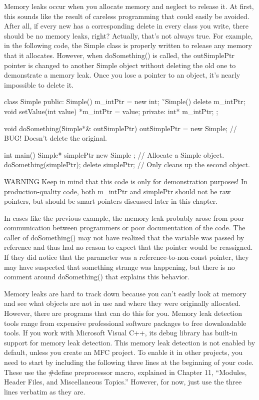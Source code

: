 Memory leaks occur when you allocate memory and neglect to release it. At first, this sounds like the result of careless programming that could easily be avoided. After all, if every new has a corresponding delete in every class you write, there should be no memory leaks, right? Actually, that’s not always true. For example, in the following code, the Simple class is properly written to release any memory that it allocates. However, when doSomething() is called, the outSimplePtr pointer is changed to another Simple object without deleting the old one to demonstrate a memory leak. Once you lose a pointer to an object, it’s nearly impossible to delete it.

\begin{cpp}
class Simple
{
    public:
    Simple() { m_intPtr = new int{}; }
    ˜Simple() { delete m_intPtr; }
    void setValue(int value) { *m_intPtr = value; }
    private:
    int* m_intPtr;
};

void doSomething(Simple*& outSimplePtr)
{
    outSimplePtr = new Simple{}; // BUG! Doesn't delete the original.
}

int main()
{
    Simple* simplePtr { new Simple{} }; // Allocate a Simple object.
    doSomething(simplePtr);
    delete simplePtr; // Only cleans up the second object.
}
\end{cpp}

\begin{myWarning}{WARNING}
Keep in mind that this code is only for demonstration purposes! In production-quality code, both m\_intPtr and simplePtr should not be raw pointers, but should be smart pointers discussed later in this chapter.
\end{myWarning}

In cases like the previous example, the memory leak probably arose from poor communication between programmers or poor documentation of the code. The caller of doSomething() may not have realized that the variable was passed by reference and thus had no reason to expect that the pointer would be reassigned. If they did notice that the parameter was a reference-to-non-const pointer, they may have suspected that something strange was happening, but there is no comment around doSomething() that explains this behavior.


Memory leaks are hard to track down because you can’t easily look at memory and see what objects are not in use and where they were originally allocated. However, there are programs that can do this for you. Memory leak detection tools range from expensive professional software packages to free downloadable tools. If you work with Microsoft Visual C++, its debug library has built-in support for memory leak detection. This memory leak detection is not enabled by default, unless you create an MFC project. To enable it in other projects, you need to start by including the following three lines at the beginning of your code. These use the \#define preprocessor macro, explained in Chapter 11, “Modules, Header Files, and Miscellaneous Topics.” However, for now, just use the three lines verbatim as they are.


